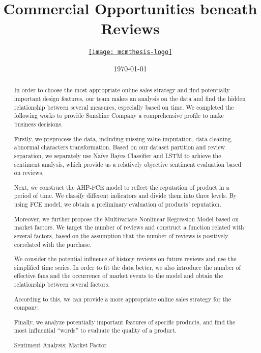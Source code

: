 \documentclass{mcmthesis}
\title{Commercial Opportunities beneath Reviews}
\author{\small \href{http://www.latexstudio.net/}
  {\texttt{[image: mcmthesis-logo]}}}
\date{\today}
\begin{document}
\begin{abstract}

  In order to choose the most appropriate online sales strategy and find potentially important design features, our team makes an analysis on the data and find the hidden relationship between several measures, especially based on time. We completed the following works to provide Sunshine Company a comprehensive profile to make business decisions.

Firstly, we preprocess the data, including missing value imputation, data cleaning, abnormal characters transformation. Based on our dataset partition and review separation, we separately use Naïve Bayes Classifier and LSTM to achieve the sentiment analysis, which provide us a relatively objective sentiment evaluation based on reviews.

Next, we construct the AHP-FCE model to reflect the reputation of product in a period of time. We classify different indicators and divide them into three levels. By using FCE model, we obtain a preliminary evaluation of products’ reputation. 

Moreover, we further propose the Multivariate Nonlinear Regression Model based on market factors. We target the number of reviews and construct a function related with several factors, based on the assumption that the number of reviews is positively correlated with the purchase. 

We consider the potential influence of history reviews on future reviews and use the simplified time series. In order to fit the data better, we also introduce the number of effective fans and the occurrence of market events to the model and obtain the relationship between several factors. 

According to this, we can provide a more appropriate online sales strategy for the company.


Finally, we analyze potentially important features of specific products, and find the most influential “words” to evaluate the quality of a product.


\begin{keywords}
Sentiment Analysis; Market Factor
\end{keywords}
\end{abstract}

\maketitle


\tableofcontents
\end{document}
